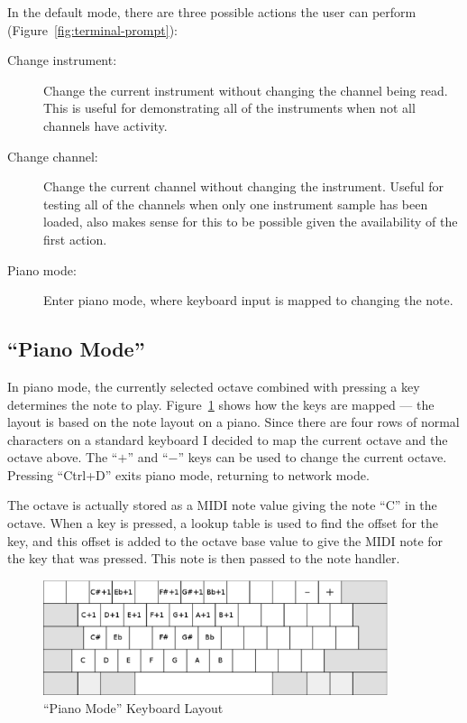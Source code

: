 In the default mode, there are three possible actions the user can perform 
(Figure~\ref{fig:terminal-prompt}):

\begin{description}
\item[Change instrument:] Change the current instrument without changing the channel being read.  
This is useful for demonstrating all of the instruments when not all channels have activity.
\item[Change channel:] Change the current channel without changing the instrument.  Useful for 
testing all of the channels when only one instrument sample has been loaded, also makes sense for 
this to be possible given the availability of the first action.
\item[Piano mode:] Enter piano mode, where keyboard input is mapped to changing the note.
\end{description}

\subsection{``Piano Mode''}

In piano mode, the currently selected octave combined with pressing a key determines the note to 
play.  Figure~\ref{fig:piano-mode} shows how the keys are mapped --- the layout is based on the note 
layout on a piano.  Since there are four rows of normal characters on a standard keyboard I decided 
to map the current octave and the octave above.  The ``$+$'' and ``$-$'' keys can be used to change 
the current octave.  Pressing ``Ctrl+D'' exits piano mode, returning to network mode.

The octave is actually stored as a MIDI note value giving the note ``C'' in the octave.  When a key 
is pressed, a lookup table is used to find the offset for the key, and this offset is added to the 
octave base value to give the MIDI note for the key that was pressed.  This note is then passed to 
the note handler.

\begin{figure}[htb]
\centering
\includegraphics[width=0.9\textwidth]{images/piano-mode}
\caption{``Piano Mode'' Keyboard Layout}\label{fig:piano-mode}
\end{figure}

